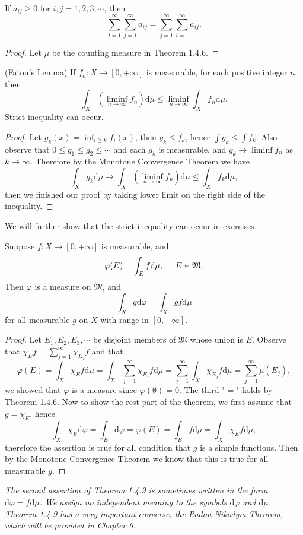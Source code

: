 \begin{corollary}
If $a_{ij}\ge 0$ for $i,j=1,2,3,\cdots$, then 
$$\sum_{i=1}^\infty\sum_{j=1}^\infty a_{ij}=\sum_{j=1}^\infty\sum_{i=1}^\infty a_{ij}.$$
\end{corollary}
\begin{proof}
Let $\mu$ be the counting measure in Theorem 1.4.6.
\end{proof}
\begin{theorem}(Fatou's Lemma)
If $f_n:X\to[0,+\infty]$ is measurable, for each positive integer $n$, then 
$$
\int_X{\left( \liminf_{n\to\infty}f_n \right) \mathrm{d}\mu}\le \liminf_{n\to\infty}\int_X{f_n\mathrm{d}\mu}.
$$
Strict inequality can occur.
\end{theorem}
\begin{proof}
Let $g_k\left( x \right) =\inf_{i\ge k}f_i\left( x \right)$, then $g_k\le f_k$, hence $\int g_k\le\int f_k$. Also observe that $0\le g_1\le g_2\le \cdots$ and each $g_k$ is measurable, and $g_k\to\liminf f_n$ as $k\to\infty$. Therefore by the Monotone Convergence Theorem we have 
$$
\int_X{g_k\mathrm{d}\mu}\rightarrow \int_X\left(\liminf_{n\to\infty}f_n\right)\mathrm{d}\mu\le \int_X{f_k\mathrm{d}\mu},
$$
then we finished our proof by taking lower limit on the right side of the inequality.
\end{proof}
We will further show that the strict inequality can occur in exercises.
\begin{theorem}
Suppose $f:X\to[0,+\infty]$ is measurable, and 
$$\varphi(E)=\int_Ef\mathrm{d}\mu,\hspace{0.5cm}E\in\mathfrak{M}.$$
Then $\varphi$ is a measure on $\mathfrak{M}$, and 
$$\int_Xg\mathrm{d}\varphi=\int_Xgf\mathrm{d}\mu$$
for all measurable $g$ on $X$ with range in $[0,+\infty]$.
\end{theorem}
\begin{proof}
Let $E_1,E_2,E_3,\cdots$ be disjoint members of $\mathfrak{M}$ whose union is $E$. Observe that $\chi_Ef=\sum_{j=1}^\infty\chi_{E_j}f$ and that 
$$
\varphi \left( E \right) =\int_X{\chi _Ef\mathrm{d}\mu}=\int_X{\sum_{j=1}^{\infty}{\chi _{E_j}}f\mathrm{d}\mu}=\sum_{j=1}^{\infty}{\int_X{\chi _{E_j}f\mathrm{d}\mu}}=\sum_{j=1}^{\infty}{\mu \left( E_j \right)},
$$
we showed that $\varphi$ is a measure since $\varphi(\emptyset)=0$. The third "$=$" holds by Theorem 1.4.6. Now to show the rest part of the theorem, we first assume that $g=\chi_E$, hence 
$$
\int_X{\chi _E\mathrm{d}\varphi}=\int_E{\mathrm{d}\varphi}=\varphi \left( E \right) =\int_E{f\mathrm{d}\mu}=\int_X{\chi _Ef\mathrm{d}\mu},
$$
therefore the assertion is true for all condition that $g$ is a simple functions. Then by the Monotone Convergence Theorem we know that this is true for all measurable $g$.
\end{proof}
\begin{note}\em
The second assertion of Theorem 1.4.9 is sometimes written in the form $\mathrm{d}\varphi=f\mathrm{d}\mu$. We assign no independent meaning to the symbols $\mathrm{d}\varphi$ and $\mathrm{d}\mu$. Theorem 1.4.9 has a very important converse, the Radon-Nikodym Theorem, which will be provided in Chapter 6.
\end{note}
